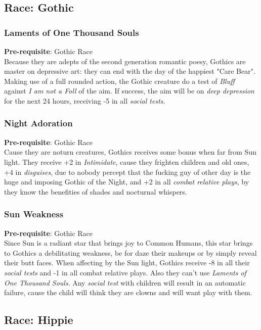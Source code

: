 \documentclass[ letterpaper,12pt]{article}
\begin{document}
\subsection{Race: Gothic}

\subsubsection{Laments of One Thousand Souls}
{\bf Pre-requisite}: Gothic Race\\
Because they are adepts of the second generation romantic poesy, Gothics are master on depressive art: they can end with the day of the happiest "Care Bear". Making use of a full rounded action, the Gothic creature do a test of {\it Bluff} against {\it I am not a Foll} of the aim. If success, the aim will be on {\it deep depression} for the next 24 hours, receiving -5 in all {\it social tests}.

\subsubsection{Night Adoration}
{\bf Pre-requisite}: Gothic Race\\
Cause they are noturn creatures, Gothics receives some bonus when far from Sun light.  They receive +2 in {\it Intimidate}, cause they frighten children and old ones, +4 in {\it disguises}, due to nobody percept that the fucking guy of other day is the huge and imposing Gothic of the Night, and +2 in all {\it combat relative plays}, by they know the benefities of shades and nocturnal whispers.\\

\subsubsection{Sun Weakness}
 {\bf Pre-requisite}: Gothic Race\\
 Since Sun is a radiant star that brings joy to Common Humans, this star brings to Gothics a debilitating weakness, be for daze their makeups or by simply reveal their butt faces. When affecting by the Sun light, Gothics receive -8 in all their {\it social tests} and -1 in all {combat relative plays}. Also they can't use {\it Laments of One Thousand Souls}. Any {\it social test} with children will result in an automatic failure, cause the child will think they are clowns and will want play with them.

\subsection{Race: Hippie}
\end{document}
